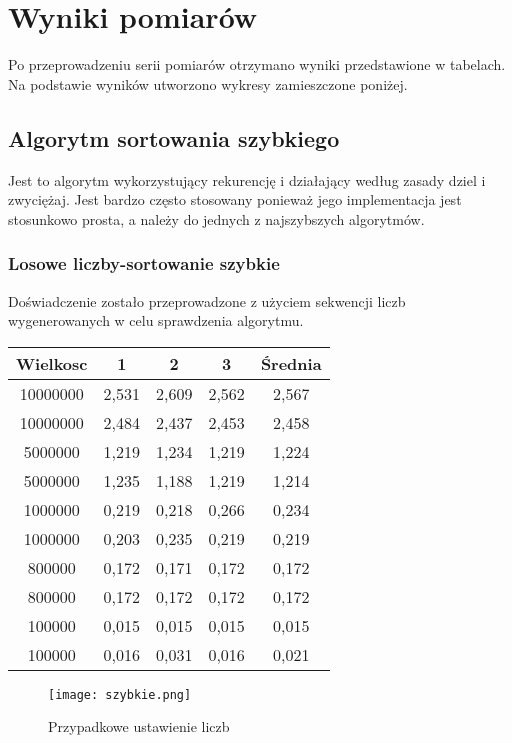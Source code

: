 \documentclass[12pt,a4paper,titlepage]{article}
\begin{document}
\section{Wyniki pomiarów}
Po przeprowadzeniu serii pomiarów otrzymano wyniki przedstawione w tabelach. Na podstawie wyników utworzono wykresy zamieszczone poniżej.


\subsection{Algorytm sortowania szybkiego}
Jest to algorytm wykorzystujący rekurencję i działający według zasady dziel i zwyciężaj. Jest bardzo często stosowany ponieważ jego implementacja jest stosunkowo prosta, a należy do jednych z najszybszych algorytmów.


\subsubsection{Losowe liczby-sortowanie szybkie}
Doświadczenie zostało przeprowadzone z użyciem sekwencji liczb wygenerowanych w celu sprawdzenia algorytmu.

\begin{center}
\begin {tabular}{|c|c|c|c|c|}\hline
Wielkosc & 1 & 2 & 3 & Średnia \\\hline
10000000&2,531&2,609&2,562&2,567\\\hline
10000000&2,484&2,437&2,453&2,458\\\hline
5000000&1,219&1,234&1,219&1,224\\\hline
5000000&1,235&1,188&1,219&1,214\\\hline
1000000&0,219&0,218&0,266&0,234\\\hline
1000000&0,203&0,235&0,219&0,219\\\hline
800000&0,172&0,171&0,172&0,172\\\hline
800000&0,172&0,172&0,172&0,172\\\hline
100000&0,015&0,015&0,015&0,015\\\hline
100000&0,016&0,031&0,016&0,021\\\hline
\end{tabular}
\end {center}
\begin{figure}[h]
\begin{center}
\texttt{[image: szybkie.png]}
\caption{Przypadkowe ustawienie liczb}
\end{center}
\end{figure}
\end{document}
